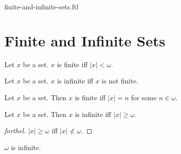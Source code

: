 \documentclass{naproche-library}
\begin{document}
\begin{smodule}{finite-and-infinite-sets.ftl}

  \section*{Finite and Infinite Sets}

  \begin{definition}[forthel,id=SET_THEORY_07_5346658235711488,printid]
    Let $x$ be a set.
    $x$ is finite iff $|x| < \omega$.
  \end{definition}

  \begin{definition}[forthel,id=SET_THEORY_07_8295412068777984,printid]
    Let $x$ be a set.
    $x$ is infinite iff $x$ is not finite.
  \end{definition}

  \begin{proposition}[forthel,id=SET_THEORY_07_3806229474312192,printid]
    Let $x$ be a set.
    Then $x$ is finite iff $|x| = n$ for some $n \in \omega$.
  \end{proposition}

  \begin{proposition}[forthel,id=SET_THEORY_07_3174577070931968,printid]
    Let $x$ be a set.
    Then $x$ is infinite iff $|x| \geq \omega$.
  \end{proposition}
  \begin{proof}[forthel]
    $|x| \geq \omega$ iff $|x| \nless \omega$.
  \end{proof}

  \begin{proposition}[forthel,id=SET_THEORY_07_9154385075632368,printid]
    $\omega$ is infinite.
  \end{proposition}
\end{smodule}
\end{document}
